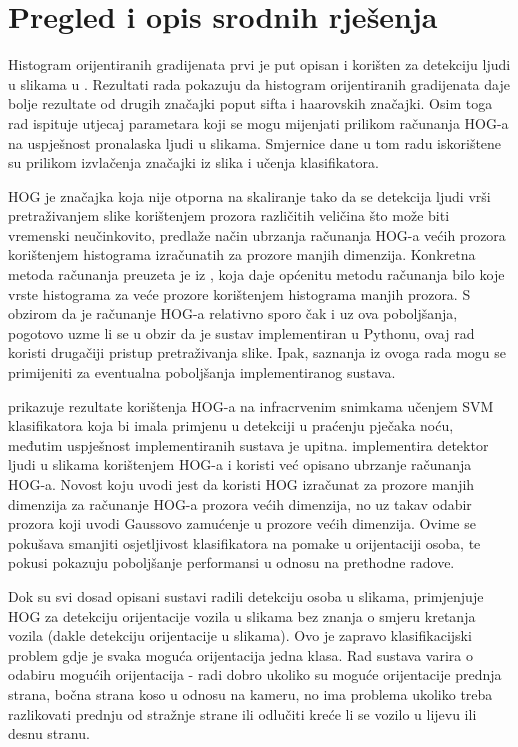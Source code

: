 \documentclass[times, utf8, seminar, numeric]{fer}
\begin{document}
\section{Pregled i opis srodnih rješenja}
Histogram orijentiranih gradijenata prvi je put opisan i korišten za detekciju ljudi u slikama  u \cite{hog}. Rezultati rada pokazuju da histogram orijentiranih gradijenata daje bolje rezultate od drugih značajki poput sifta i haarovskih značajki. Osim toga rad ispituje utjecaj parametara koji se mogu mijenjati prilikom računanja HOG-a na uspješnost pronalaska ljudi u slikama. Smjernice dane u tom radu iskorištene su prilikom izvlačenja značajki iz slika i učenja klasifikatora.

HOG je značajka koja nije otporna na skaliranje tako da se detekcija ljudi vrši pretraživanjem slike korištenjem prozora različitih veličina što može biti vremenski neučinkovito, \cite{fast} predlaže način ubrzanja računanja HOG-a većih prozora korištenjem histograma izračunatih za prozore manjih dimenzija. Konkretna metoda računanja preuzeta je iz \cite{hog1}, koja daje općenitu metodu računanja bilo koje vrste histograma za veće prozore korištenjem histograma manjih prozora. S obzirom da je računanje HOG-a relativno sporo čak i uz ova poboljšanja, pogotovo uzme li se u obzir da je sustav implementiran u Pythonu, ovaj rad koristi drugačiji pristup pretraživanja slike. Ipak, saznanja iz ovoga rada mogu se primijeniti za eventualna poboljšanja implementiranog sustava.

\cite{pedestrian} prikazuje rezultate korištenja HOG-a na infracrvenim snimkama učenjem SVM klasifikatora koja bi imala primjenu u detekciji u praćenju pječaka noću, međutim uspješnost implementiranih sustava je upitna.\cite{enhancing} implementira detektor ljudi u slikama korištenjem HOG-a i koristi već opisano ubrzanje računanja HOG-a. Novost koju uvodi jest da koristi HOG izračunat za prozore manjih dimenzija za računanje HOG-a prozora većih dimenzija, no uz takav odabir prozora koji uvodi Gaussovo zamućenje u prozore većih dimenzija. Ovime se pokušava smanjiti osjetljivost klasifikatora na pomake u orijentaciji osoba, te pokusi pokazuju poboljšanje performansi u odnosu na prethodne radove.

Dok su svi dosad opisani sustavi radili detekciju osoba u slikama, \cite{visual} primjenjuje HOG za detekciju orijentacije vozila u slikama bez znanja o smjeru kretanja vozila (dakle detekciju orijentacije u slikama). Ovo je zapravo klasifikacijski problem gdje je svaka moguća orijentacija jedna klasa. Rad sustava varira o odabiru mogućih orijentacija - radi dobro ukoliko su moguće orijentacije prednja strana, bočna strana koso u odnosu na kameru, no ima problema ukoliko treba razlikovati prednju od stražnje strane ili odlučiti kreće li se vozilo u lijevu ili desnu stranu.
\end{document}

